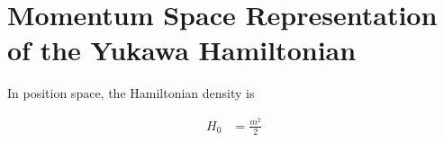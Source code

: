\section{Momentum Space Representation of the Yukawa Hamiltonian}
\label{sec:hamiltonian}

In position space, the Hamiltonian density is 

\begin{align}
    H_0 &= \frac{m^2}{2}
\end{align}